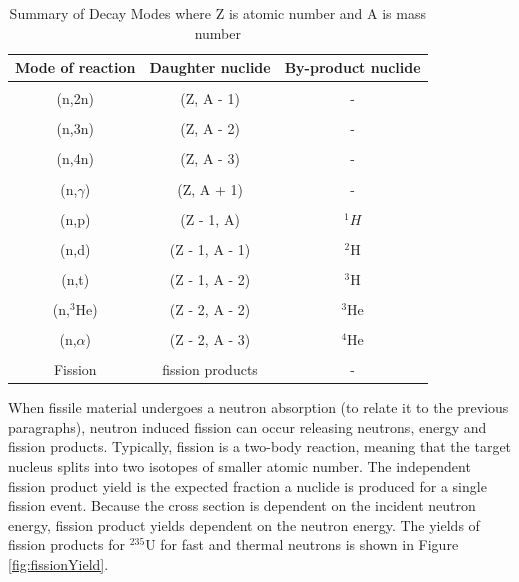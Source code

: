 \begin{table}[t]
    \caption{\label{tab:reactionModes} Summary of Decay Modes where Z is atomic number and A is mass number \cite{pusaThesis}}
    \centering
    \begin{tabular}{c|c|c}
    \hline
    \textbf{Mode of reaction} & \textbf{Daughter nuclide} & \textbf{By-product nuclide} \\ [0.5ex] 
    \hline
    \hline
    \\ [-1em]
    (n,2n) & (Z, A - 1) & - \\ \hline 
    \\ [-1em]
    (n,3n) & (Z, A - 2) & - \\ \hline 
    \\ [-1em]
    (n,4n) & (Z, A - 3) & - \\ \hline 
    \\ [-1em]
    (n,$\gamma$) & (Z, A + 1) & - \\ \hline 
    \\ [-1em]
    (n,p) & (Z - 1, A) & ${}^{1}H$ \\ \hline 
    \\ [-1em]
    (n,d) & (Z - 1, A - 1) & ${}^{2}$H \\ \hline 
    \\ [-1em]
    (n,t) & (Z - 1, A - 2) & ${}^{3}$H \\ \hline 
    \\ [-1em]
    (n,${}^{3}$He) & (Z - 2, A - 2) & ${}^{3}$He \\ \hline 
    \\ [-1em]
    (n,$\alpha$) & (Z - 2, A - 3) & ${}^{4}$He \\ \hline 
    \\ [-1em]
    Fission & fission products & - \\ \hline
    \end{tabular}
\end{table}

When fissile material undergoes a neutron absorption (to relate it to the previous paragraphs), neutron induced fission can occur releasing neutrons, energy and fission products. Typically, fission is a two-body reaction, meaning that the target nucleus splits into two isotopes of smaller atomic number. The independent fission product yield is the expected fraction a nuclide is produced for a single fission event. Because the cross section is dependent on the incident neutron energy, fission product yields dependent on the neutron energy. The yields of fission products for ${}^{235}$U for fast and thermal neutrons is shown in Figure \ref{fig:fissionYield}.

